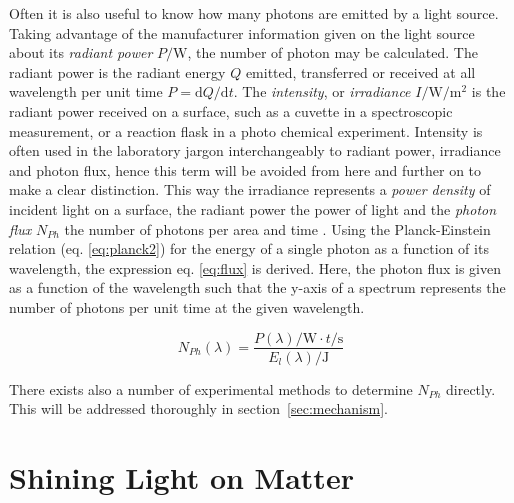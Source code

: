 	Often it is also useful to know how many photons are emitted by a light source. Taking advantage of the manufacturer information given on the light source about its \emph{radiant power} $P/\unit{\W}$, the number of photon may be calculated. The radiant power is the radiant energy $Q$ emitted, transferred or received at all wavelength per unit time $P = \mathrm{d}Q/\mathrm{d}t$. The \emph{intensity}, or \emph{irradiance} $I/\unit{\W\per\square\m}$ is the radiant power received on a surface, such as a cuvette in a spectroscopic measurement, or a reaction flask in a photo chemical experiment. Intensity is often used in the laboratory jargon interchangeably to radiant power, irradiance and photon flux, hence this term will be avoided from here and further on to make a clear distinction. This way the irradiance represents a \emph{power density} of incident light on a surface, the radiant power the power of light and the \emph{photon flux} $N_{Ph}$ the number of photons per area and time . Using the Planck-Einstein relation (eq. \ref{eq:planck2}) for the energy of a single photon as a function of its wavelength, the expression eq. \ref{eq:flux} is derived. Here, the photon flux is given as a function of the wavelength such that the y-axis of a spectrum represents the number of photons per unit time at the given wavelength.

	\begin{equation}
		\label{eq:flux}
		N_{Ph}(\lambda) = \frac{P(\lambda)/\unit{\W}\cdot t/\unit{\s}}{E_l(\lambda)/\unit{\J}}
	\end{equation} 

	There exists also a number of experimental methods to determine $N_{Ph}$ directly. This will be addressed thoroughly in section~\ref{sec:mechanism}.



	\section{Shining Light on Matter}

